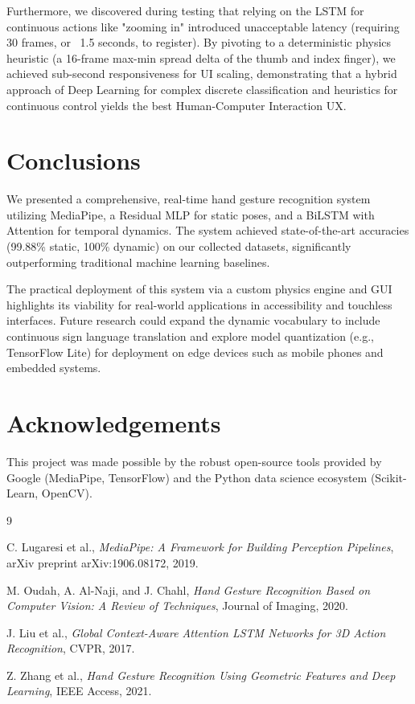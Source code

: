 \documentclass[10pt,twocolumn,letterpaper]{article}
\begin{document}
Furthermore, we discovered during testing that relying on the LSTM for continuous actions like "zooming in" introduced unacceptable latency (requiring 30 frames, or ~1.5 seconds, to register). By pivoting to a deterministic physics heuristic (a 16-frame max-min spread delta of the thumb and index finger), we achieved sub-second responsiveness for UI scaling, demonstrating that a hybrid approach of Deep Learning for complex discrete classification and heuristics for continuous control yields the best Human-Computer Interaction UX.

\section*{Conclusions}

We presented a comprehensive, real-time hand gesture recognition system utilizing MediaPipe, a Residual MLP for static poses, and a BiLSTM with Attention for temporal dynamics. The system achieved state-of-the-art accuracies (99.88\% static, 100\% dynamic) on our collected datasets, significantly outperforming traditional machine learning baselines. 

The practical deployment of this system via a custom physics engine and GUI highlights its viability for real-world applications in accessibility and touchless interfaces. Future research could expand the dynamic vocabulary to include continuous sign language translation and explore model quantization (e.g., TensorFlow Lite) for deployment on edge devices such as mobile phones and embedded systems.

\section*{Acknowledgements}
This project was made possible by the robust open-source tools provided by Google (MediaPipe, TensorFlow) and the Python data science ecosystem (Scikit-Learn, OpenCV).

\begin{thebibliography}{9}

C. Lugaresi et al., 
\textit{MediaPipe: A Framework for Building Perception Pipelines}, 
arXiv preprint arXiv:1906.08172, 2019.

M. Oudah, A. Al-Naji, and J. Chahl, 
\textit{Hand Gesture Recognition Based on Computer Vision: A Review of Techniques}, 
Journal of Imaging, 2020.

J. Liu et al., 
\textit{Global Context-Aware Attention LSTM Networks for 3D Action Recognition}, 
CVPR, 2017.

Z. Zhang et al., 
\textit{Hand Gesture Recognition Using Geometric Features and Deep Learning}, 
IEEE Access, 2021.

\end{thebibliography}
\end{document}
